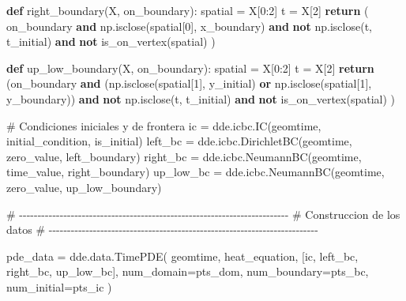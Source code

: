 \documentclass[
  spanish,
  us-letterpaper,
]{scrreprt}
\newenvironment{Shaded}{\begin{snugshade}}{\end{snugshade}}
\newcommand{\CommentTok}[1]{\textcolor[rgb]{0.37,0.37,0.37}{#1}}
\newcommand{\ControlFlowTok}[1]{\textcolor[rgb]{0.00,0.23,0.31}{\textbf{#1}}}
\newcommand{\DecValTok}[1]{\textcolor[rgb]{0.68,0.00,0.00}{#1}}
\newcommand{\KeywordTok}[1]{\textcolor[rgb]{0.00,0.23,0.31}{\textbf{#1}}}
\newcommand{\NormalTok}[1]{\textcolor[rgb]{0.00,0.23,0.31}{#1}}
\newcommand{\OperatorTok}[1]{\textcolor[rgb]{0.37,0.37,0.37}{#1}}
\theoremstyle{definition}
\theoremstyle{plain}
\theoremstyle{remark}
\begin{document}
\begin{Shaded}
\begin{Highlighting}[]
\KeywordTok{def}\NormalTok{ right\_boundary(X, on\_boundary):}
\NormalTok{    spatial }\OperatorTok{=}\NormalTok{ X[}\DecValTok{0}\NormalTok{:}\DecValTok{2}\NormalTok{]}
\NormalTok{    t }\OperatorTok{=}\NormalTok{ X[}\DecValTok{2}\NormalTok{]}
    \ControlFlowTok{return}\NormalTok{ (}
\NormalTok{        on\_boundary }
        \KeywordTok{and}\NormalTok{ np.isclose(spatial[}\DecValTok{0}\NormalTok{], x\_boundary) }
        \KeywordTok{and} \KeywordTok{not}\NormalTok{ np.isclose(t, t\_initial) }
        \KeywordTok{and} \KeywordTok{not}\NormalTok{ is\_on\_vertex(spatial)}
\NormalTok{    )}

\KeywordTok{def}\NormalTok{ up\_low\_boundary(X, on\_boundary):}
\NormalTok{    spatial }\OperatorTok{=}\NormalTok{ X[}\DecValTok{0}\NormalTok{:}\DecValTok{2}\NormalTok{]}
\NormalTok{    t }\OperatorTok{=}\NormalTok{ X[}\DecValTok{2}\NormalTok{]}
    \ControlFlowTok{return}\NormalTok{ (on\_boundary }
    \KeywordTok{and}\NormalTok{ (np.isclose(spatial[}\DecValTok{1}\NormalTok{], y\_initial) }
    \KeywordTok{or}\NormalTok{ np.isclose(spatial[}\DecValTok{1}\NormalTok{], y\_boundary)) }
    \KeywordTok{and} \KeywordTok{not}\NormalTok{ np.isclose(t, t\_initial) }
    \KeywordTok{and} \KeywordTok{not}\NormalTok{ is\_on\_vertex(spatial)}
\NormalTok{    )}

\CommentTok{\# Condiciones iniciales y de frontera}
\NormalTok{ic }\OperatorTok{=}\NormalTok{ dde.icbc.IC(geomtime, initial\_condition, is\_initial)}
\NormalTok{left\_bc }\OperatorTok{=}\NormalTok{ dde.icbc.DirichletBC(geomtime, }
\NormalTok{                                zero\_value, left\_boundary)}
\NormalTok{right\_bc }\OperatorTok{=}\NormalTok{ dde.icbc.NeumannBC(geomtime,}
\NormalTok{                                time\_value, right\_boundary)}
\NormalTok{up\_low\_bc }\OperatorTok{=}\NormalTok{ dde.icbc.NeumannBC(geomtime, }
\NormalTok{                                zero\_value, up\_low\_boundary)}

\CommentTok{\# {-}{-}{-}{-}{-}{-}{-}{-}{-}{-}{-}{-}{-}{-}{-}{-}{-}{-}{-}{-}{-}{-}{-}{-}{-}{-}{-}{-}{-}{-}{-}{-}{-}{-}{-}{-}{-}{-}{-}{-}{-}{-}{-}{-}{-}{-}{-}{-}{-}{-}{-}{-}{-}{-}{-}{-}{-}{-}{-}{-}{-}{-}{-}{-}{-}{-}{-}{-}{-}{-}{-}{-}{-}}
\CommentTok{\# Construccion de los datos}
\CommentTok{\# {-}{-}{-}{-}{-}{-}{-}{-}{-}{-}{-}{-}{-}{-}{-}{-}{-}{-}{-}{-}{-}{-}{-}{-}{-}{-}{-}{-}{-}{-}{-}{-}{-}{-}{-}{-}{-}{-}{-}{-}{-}{-}{-}{-}{-}{-}{-}{-}{-}{-}{-}{-}{-}{-}{-}{-}{-}{-}{-}{-}{-}{-}{-}{-}{-}{-}{-}{-}{-}{-}{-}{-}{-}}

\NormalTok{pde\_data }\OperatorTok{=}\NormalTok{ dde.data.TimePDE(}
\NormalTok{    geomtime,}
\NormalTok{    heat\_equation,}
\NormalTok{    [ic, left\_bc, right\_bc, up\_low\_bc],}
\NormalTok{    num\_domain}\OperatorTok{=}\NormalTok{pts\_dom,}
\NormalTok{    num\_boundary}\OperatorTok{=}\NormalTok{pts\_bc,}
\NormalTok{    num\_initial}\OperatorTok{=}\NormalTok{pts\_ic }
\NormalTok{)}


\end{Highlighting}
\end{Shaded}
\end{document}
